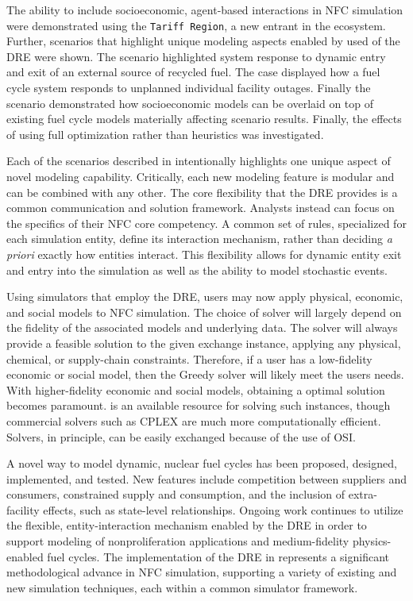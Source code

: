 The ability to include socioeconomic, agent-based interactions in NFC simulation
were demonstrated using the \texttt{Tariff Region}, a new entrant in the \Cyclus
ecosystem. Further, scenarios that highlight unique modeling aspects enabled by
used of the DRE were shown. The \external scenario highlighted system response
to dynamic entry and exit of an external source of recycled fuel. The \outage
case displayed how a fuel cycle system responds to unplanned individual facility
outages. Finally the \tariff scenario demonstrated how socioeconomic models can
be overlaid on top of existing fuel cycle models materially affecting scenario
results. Finally, the effects of using full optimization rather than heuristics
was investigated.

Each of the scenarios described in  intentionally highlights
one unique aspect of novel modeling capability. Critically, each new modeling
feature is modular and can be combined with any other. The core flexibility that
the DRE provides is a common communication and solution framework. Analysts
instead can focus on the specifics of their NFC core competency. A common set of
rules, specialized for each simulation entity, define its interaction mechanism,
rather than deciding \textit{a priori} exactly how entities interact. This
flexibility allows for dynamic entity exit and entry into the simulation as well
as the ability to model stochastic events.

Using simulators that employ the DRE, users may now apply physical, economic,
and social models to NFC simulation. The choice of solver will largely depend on
the fidelity of the associated models and underlying data. The \greedy solver
will always provide a feasible solution to the given exchange instance, applying
any physical, chemical, or supply-chain constraints. Therefore, if a user has a
low-fidelity economic or social model, then the Greedy solver will likely meet
the users needs. With higher-fidelity economic and social models, obtaining a
optimal solution becomes paramount. \cbc is an available resource for solving
such instances, though commercial solvers such as CPLEX are much more
computationally efficient. Solvers, in principle, can be easily exchanged
because of the use of OSI.

A novel way to model dynamic, nuclear fuel cycles has been proposed, designed,
implemented, and tested. New features include competition between suppliers and
consumers, constrained supply and consumption, and the inclusion of
extra-facility effects, such as state-level relationships. Ongoing work
continues to utilize the flexible, entity-interaction mechanism enabled by the
DRE in order to support modeling of nonproliferation applications and
medium-fidelity physics-enabled fuel cycles. The implementation of the DRE in
\Cyclus represents a significant methodological advance in NFC simulation,
supporting a variety of existing and new simulation techniques, each within a
common simulator framework.

